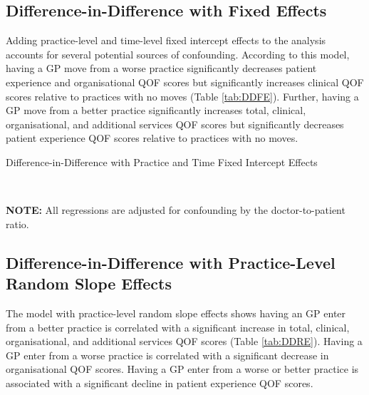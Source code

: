 \documentclass[11pt]{article}
\begin{document}
\subsection{Difference-in-Difference with Fixed Effects}

Adding practice-level and time-level fixed intercept effects to the analysis accounts for several potential sources of confounding. According to this model, having a GP move from a worse practice significantly decreases patient experience and organisational QOF scores but significantly increases clinical QOF scores relative to practices with no moves (Table \ref{tab:DDFE}). Further, having a GP move from a better practice significantly increases total, clinical, organisational, and additional services QOF scores but significantly decreases patient experience QOF scores relative to practices with no moves.

\begin{landscape}
  \begin{table}[htp]
  \caption{Difference-in-Difference with Practice and Time Fixed Intercept Effects}
    \begin{threeparttable}
    \\
    \begin{tablenotes}
    \footnotesize
    \textbf{NOTE:} All regressions are adjusted for confounding by the doctor-to-patient ratio.
    \end{tablenotes}
    \end{threeparttable}
    \label{tab:DDFE}
  \end{table}
\end{landscape}



\subsection{Difference-in-Difference with Practice-Level Random Slope Effects}

The model with practice-level random slope effects shows having an GP enter from a better practice is correlated with a significant increase in total, clinical, organisational, and additional services QOF scores (Table \ref{tab:DDRE}). Having a GP enter from a worse practice is correlated with a significant decrease in organisational QOF scores. Having a GP enter from a worse or better practice is associated with a significant decline in patient experience QOF scores.
\end{document}
